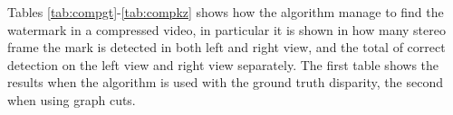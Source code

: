 Tables \ref{tab:compgt}-\ref{tab:compkz} shows how the algorithm manage to find the watermark in a compressed video, in particular it is shown in how many stereo frame the mark is detected in both left and right view, and the total of correct detection on the left view and right view separately. The first table shows the results when the algorithm is used with the ground truth disparity, the second when using graph cuts.

\clearpage

\begin{table}[htbp]

 \begin{center}
 \caption{ detection table when ground truth disparity is used  \label{tab:compgt}}
 \end{center}
 \end{table}

